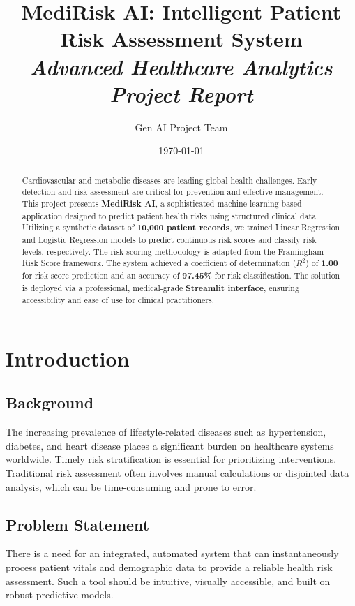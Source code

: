 \documentclass[12pt, a4paper]{article}
\title{
    \textbf{MediRisk AI: Intelligent Patient Risk Assessment System} \\
    \large \textit{Advanced Healthcare Analytics Project Report}
}
\author{Gen AI Project Team}
\date{\today}
\begin{document}
\maketitle

\begin{abstract}
Cardiovascular and metabolic diseases are leading global health challenges. Early detection and risk assessment are critical for prevention and effective management. This project presents \textbf{MediRisk AI}, a sophisticated machine learning-based application designed to predict patient health risks using structured clinical data. Utilizing a synthetic dataset of \textbf{10,000 patient records}, we trained Linear Regression and Logistic Regression models to predict continuous risk scores and classify risk levels, respectively. The risk scoring methodology is adapted from the Framingham Risk Score framework. The system achieved a coefficient of determination ($R^2$) of \textbf{1.00} for risk score prediction and an accuracy of \textbf{97.45\%} for risk classification. The solution is deployed via a professional, medical-grade \textbf{Streamlit interface}, ensuring accessibility and ease of use for clinical practitioners.
\end{abstract}

\section{Introduction}
\subsection{Background}
The increasing prevalence of lifestyle-related diseases such as hypertension, diabetes, and heart disease places a significant burden on healthcare systems worldwide. Timely risk stratification is essential for prioritizing interventions. Traditional risk assessment often involves manual calculations or disjointed data analysis, which can be time-consuming and prone to error.

\subsection{Problem Statement}
There is a need for an integrated, automated system that can instantaneously process patient vitals and demographic data to provide a reliable health risk assessment. Such a tool should be intuitive, visually accessible, and built on robust predictive models.
\end{document}
